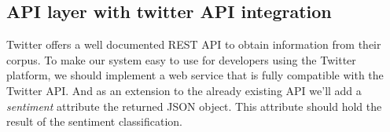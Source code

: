	\subsection{API layer with twitter API integration}
	Twitter offers a well documented REST API to obtain information from their corpus. To make our system easy to use for developers using the Twitter platform, we should implement a web service that is fully compatible with the Twitter API. And as an extension to the already existing API we'll add a \emph{sentiment} attribute the returned JSON object. This attribute should hold the result of the sentiment classification.
	
	